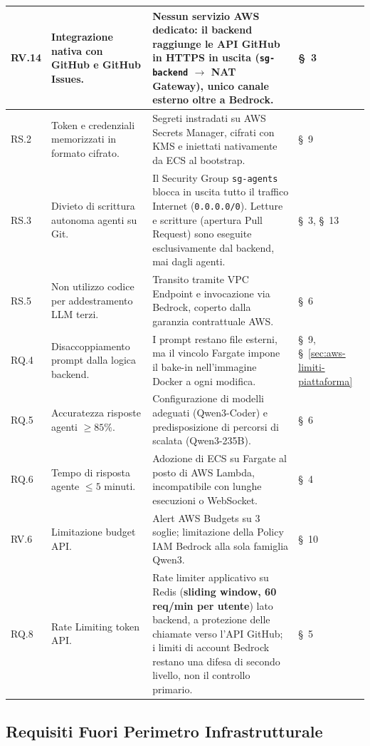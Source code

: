 \documentclass[11pt,a4paper]{article}
\begin{document}
\begin{center}
\begin{xltabular}{\textwidth}{|l|X|X|l|}
RV.14 & Integrazione nativa con GitHub e GitHub Issues. & Nessun servizio AWS dedicato: il backend raggiunge le API GitHub in HTTPS in uscita (\texttt{sg-backend} $\to$ NAT Gateway), unico canale esterno oltre a Bedrock. & \S~3 \\ \hline
RS.2 & Token e credenziali memorizzati in formato cifrato. & Segreti instradati su AWS Secrets Manager, cifrati con KMS e iniettati nativamente da ECS al bootstrap. & \S~9 \\ \hline
RS.3 & Divieto di scrittura autonoma agenti su Git. & Il Security Group \texttt{sg-agents} blocca in uscita tutto il traffico Internet (\texttt{0.0.0.0/0}). Letture e scritture (apertura Pull Request) sono eseguite esclusivamente dal backend, mai dagli agenti. & \S~3, \S~13 \\ \hline
RS.5 & Non utilizzo codice per addestramento LLM terzi. & Transito tramite VPC Endpoint e invocazione via Bedrock, coperto dalla garanzia contrattuale AWS. & \S~6 \\ \hline
RQ.4 & Disaccoppiamento prompt dalla logica backend. & I prompt restano file esterni, ma il vincolo Fargate impone il bake-in nell'immagine Docker a ogni modifica. & \S~9, \S~\ref{sec:aws-limiti-piattaforma} \\ \hline
RQ.5 & Accuratezza risposte agenti $\geq 85\%$. & Configurazione di modelli adeguati (Qwen3-Coder) e predisposizione di percorsi di scalata (Qwen3-235B). & \S~6 \\ \hline
RQ.6 & Tempo di risposta agente $\leq 5$ minuti. & Adozione di ECS su Fargate al posto di AWS Lambda, incompatibile con lunghe esecuzioni o WebSocket. & \S~4 \\ \hline
RV.6 & Limitazione budget API. & Alert AWS Budgets su 3 soglie; limitazione della Policy IAM Bedrock alla sola famiglia Qwen3. & \S~10 \\ \hline
RQ.8 & Rate Limiting token API. & Rate limiter applicativo su Redis (\textbf{sliding window, 60 req/min per utente}) lato backend, a protezione delle chiamate verso l'API GitHub; i limiti di account Bedrock restano una difesa di secondo livello, non il controllo primario. & \S~5 \\ \hline
\end{xltabular}
\end{center}

\subsection*{Requisiti Fuori Perimetro Infrastrutturale}
\end{document}
